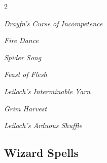 \documentclass[10pt,a4paper,twoside,bg=print,twocolumn,openany,nodeprecatedcode]{dndbook}
\begin{document}
\begin{description}
\begin{multicols}{2}
\begin{description}
\item \textit{Drayfn's Curse of Incompetence}
\item \textit{Fire Dance}
\item \textit{Spider Song}
\end{description}

{\par \vspace { 9pt plus 3pt minus 3pt } \noindent  {} \nopagebreak }

\begin{description}
\item \textit{Feast of Flesh}
\item \textit{Leiloch's Interminable Yarn}
\end{description}

{\par \vspace { 9pt plus 3pt minus 3pt } \noindent  {} \nopagebreak }

\begin{description}
\item \textit{Grim Harvest}
\end{description}

{\par \vspace { 9pt plus 3pt minus 3pt } \noindent  {} \nopagebreak }

\begin{description}
\item \textit{Leiloch's Arduous Shuffle}
\end{description}

\end{multicols}

\end{description}

\subsection{Wizard Spells}
\end{document}
